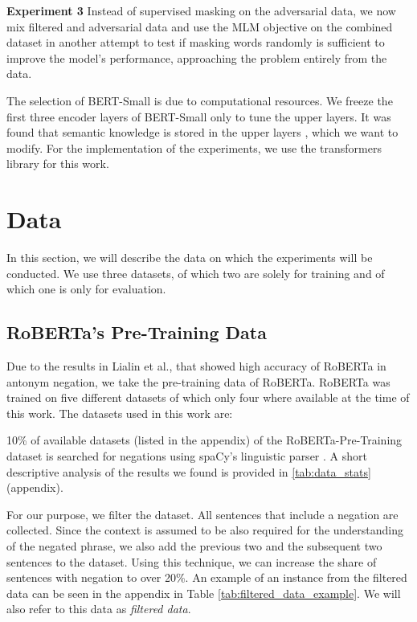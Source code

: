 \documentclass{article}
\begin{document}
\textbf{Experiment 3}
Instead of supervised masking on the adversarial data, we now mix filtered and adversarial data and use the MLM objective on the combined dataset in another attempt to test if masking words randomly is sufficient to improve the model's performance, approaching the problem entirely from the data.

The selection of BERT-Small is due to computational resources. We freeze the first three encoder layers of BERT-Small only to tune the upper layers. It was found that semantic knowledge is stored in the upper layers \citep{jawahar-etal-2019-bert}, which we want to modify. For the implementation of the experiments, we use the transformers library \citep{wolf-etal-2020-transformers} for this work.

\section{Data}
\label{section::data}
In this section, we will describe the data on which the experiments will be conducted. We use three datasets, of which two are solely for training and of which one is only for evaluation. 

\subsection{RoBERTa's Pre-Training Data}
Due to the results in Lialin et al., that showed high accuracy of RoBERTa in antonym negation, we take the pre-training data of RoBERTa. RoBERTa was trained on five different datasets of which only four where available at the time of this work. The datasets used in this work are: 

10\% of available datasets (listed in the appendix) of the RoBERTa-Pre-Training dataset is searched for negations using spaCy's linguistic parser \citep{Honnibal-Spacy-2017}. A short descriptive analysis of the results we found is provided in \ref{tab:data_stats} (appendix).

For our purpose, we filter the dataset. All sentences that include a negation are collected. Since the context is assumed to be also required for the understanding of the negated phrase, we also add the previous two and the subsequent two sentences to the dataset. Using this technique, we can increase the share of sentences with negation to over 20\%. An example of an instance from the filtered data can be seen in the appendix in Table \ref{tab:filtered_data_example}. We will also refer to this data as \textit{filtered data}.
\end{document}
